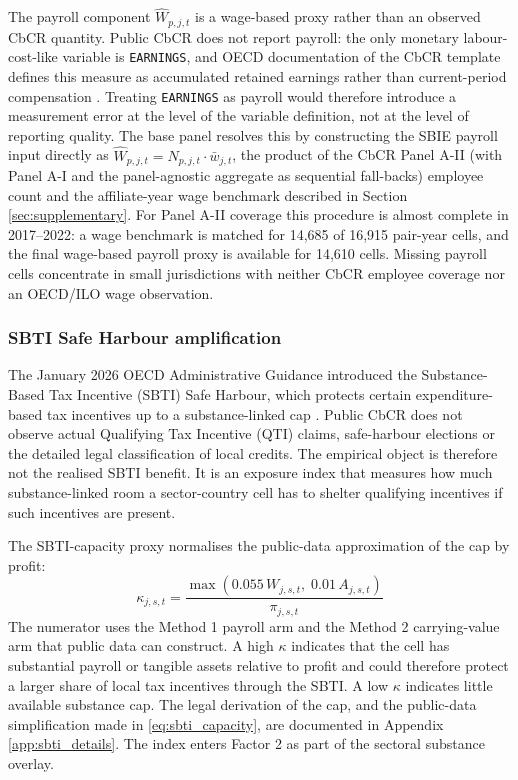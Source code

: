 \documentclass[11pt,a4paper]{article}
\newcommand{\code}[1]{\texttt{#1}}
\begin{document}
The payroll component $\hat{W}_{p,j,t}$ is a wage-based proxy rather than an observed CbCR quantity.\label{sec:payroll_imputation} Public CbCR does not report payroll: the only monetary labour-cost-like variable is \code{EARNINGS}, and OECD documentation of the CbCR template defines this measure as accumulated retained earnings rather than current-period compensation \citep{oecd2025a}. Treating \code{EARNINGS} as payroll would therefore introduce a measurement error at the level of the variable definition, not at the level of reporting quality. The base panel resolves this by constructing the SBIE payroll input directly as $\hat{W}_{p,j,t} = N_{p,j,t} \cdot \bar{w}_{j,t}$, the product of the CbCR Panel A-II (with Panel A-I and the panel-agnostic aggregate as sequential fall-backs) employee count and the affiliate-year wage benchmark described in Section \ref{sec:supplementary}. For Panel A-II coverage this procedure is almost complete in 2017--2022: a wage benchmark is matched for 14{,}685 of 16{,}915 pair-year cells, and the final wage-based payroll proxy is available for 14{,}610 cells. Missing payroll cells concentrate in small jurisdictions with neither CbCR employee coverage nor an OECD/ILO wage observation.

\subsubsection{SBTI Safe Harbour amplification}\label{sec:sbti_amplification}\label{sec:sbti}

The January 2026 OECD Administrative Guidance introduced the Substance-Based Tax Incentive (SBTI) Safe Harbour, which protects certain expenditure-based tax incentives up to a substance-linked cap \citep{oecd2026}. Public CbCR does not observe actual Qualifying Tax Incentive (QTI) claims, safe-harbour elections or the detailed legal classification of local credits. The empirical object is therefore not the realised SBTI benefit. It is an exposure index that measures how much substance-linked room a sector-country cell has to shelter qualifying incentives if such incentives are present.

The SBTI-capacity proxy normalises the public-data approximation of the cap by profit:
\begin{equation}\label{eq:sbti_capacity}
\kappa_{j,s,t} = \frac{\max\!\left(0.055\,W_{j,s,t},\; 0.01\,A_{j,s,t}\right)}{\pi_{j,s,t}}
\end{equation}
The numerator uses the Method 1 payroll arm and the Method 2 carrying-value arm that public data can construct. A high $\kappa$ indicates that the cell has substantial payroll or tangible assets relative to profit and could therefore protect a larger share of local tax incentives through the SBTI. A low $\kappa$ indicates little available substance cap. The legal derivation of the cap, and the public-data simplification made in \eqref{eq:sbti_capacity}, are documented in Appendix \ref{app:sbti_details}. The index enters Factor 2 as part of the sectoral substance overlay.
\end{document}
